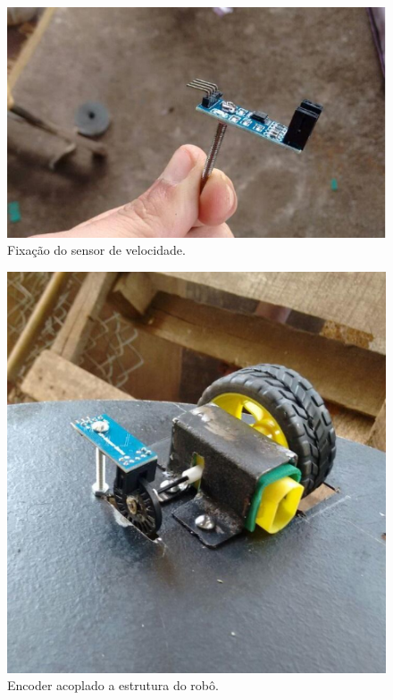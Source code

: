 \begin{itemize}
         \begin{figure}[H]
            \centering
            \includegraphics[scale=0.5]{figuras/fixacaoencoder.png}
            \caption{Fixação do sensor de velocidade.}
            \label{img:fixacao_encoder}
         \end{figure}

        \begin{figure}[H]
            \centering
            \includegraphics[scale=0.4]{figuras/novosistema.png}
            \caption{Encoder acoplado a estrutura do robô.}
            \label{img:novosistema}
         \end{figure}


\end{itemize}
